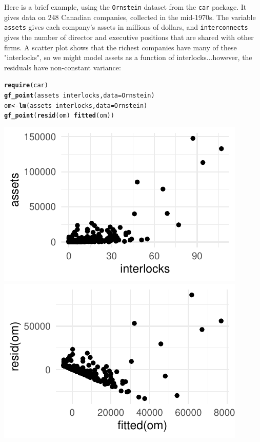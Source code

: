 \documentclass[twoside]{book}\usepackage[]{graphicx}\usepackage[]{xcolor}
\makeatletter
\def\maxwidth{ %
  \ifdim\Gin@nat@width>\linewidth
    \linewidth
  \else
    \Gin@nat@width
  \fi
}
\newcommand{\hlopt}[1]{\textcolor[rgb]{0,0,0}{#1}}%
\newcommand{\hlstd}[1]{\textcolor[rgb]{0.345,0.345,0.345}{#1}}%
\newcommand{\hlkwb}[1]{\textcolor[rgb]{0.69,0.353,0.396}{#1}}%
\newcommand{\hlkwc}[1]{\textcolor[rgb]{0.333,0.667,0.333}{#1}}%
\newcommand{\hlkwd}[1]{\textcolor[rgb]{0.737,0.353,0.396}{\textbf{#1}}}%
\newenvironment{kframe}{%
 \def\at@end@of@kframe{}%
 \ifinner\ifhmode%
  \def\at@end@of@kframe{\end{minipage}}%
  \begin{minipage}{\columnwidth}%
 \fi\fi%
 \def\FrameCommand##1{\hskip\@totalleftmargin \hskip-\fboxsep
 \colorbox{shadecolor}{##1}\hskip-\fboxsep
     \hskip-\linewidth \hskip-\@totalleftmargin \hskip\columnwidth}%
 \MakeFramed {\advance\hsize-\width
   \@totalleftmargin\z@ \linewidth\hsize
   \@setminipage}}%
 {\par\unskip\endMakeFramed%
 \at@end@of@kframe}
\newenvironment{knitrout}{}{} %
\newcounter{example}[section]
\makeatother
\begin{document}
Here is a brief example, using the \texttt{Ornstein} dataset from the \texttt{car} package.  It gives data on 248 Canadian companies, collected in the mid-1970s.  The variable \texttt{assets} gives each company's assets in millions of dollars, and \texttt{interconnects} gives the number of director and executive positions that are shared with other firms.  A scatter plot shows that the richest companies have many of these "interlocks", so we might model assets as a function of interlocks...however, the residuals have non-constant variance:
\begin{knitrout}
\color{fgcolor}\begin{kframe}
\begin{alltt}
\hlkwd{require}\hlstd{(car)}
\hlkwd{gf_point}\hlstd{(assets} \hlopt{~} \hlstd{interlocks,} \hlkwc{data} \hlstd{= Ornstein)}
\hlstd{om} \hlkwb{<-} \hlkwd{lm}\hlstd{(assets} \hlopt{~} \hlstd{interlocks,} \hlkwc{data} \hlstd{= Ornstein)}
\hlkwd{gf_point}\hlstd{(}\hlkwd{resid}\hlstd{(om)} \hlopt{~} \hlkwd{fitted}\hlstd{(om))}
\end{alltt}
\end{kframe}

{\centering \includegraphics[width=\maxwidth]{figures/fig-Ornstein-1} 
\includegraphics[width=\maxwidth]{figures/fig-Ornstein-2} 

}



\end{knitrout}
\end{document}
